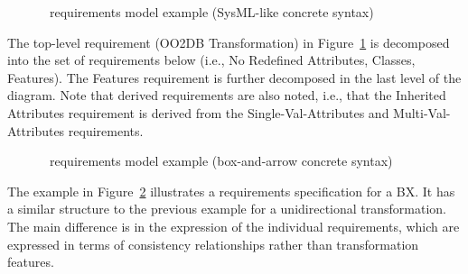 \begin{figure}[htbp]
\caption{\transml\ requirements model example (SysML-like concrete syntax) \cite{GuerraLKPS13}}
\label{fig:transml-requirements-example1}
\end{figure}

The top-level requirement (OO2DB Transformation) in Figure~\ref{fig:transml-requirements-example1} is decomposed into the set of requirements below (i.e., No Redefined Attributes, Classes, Features). The Features requirement is further decomposed in the last level of the diagram. Note that derived requirements are also noted, i.e., that the Inherited Attributes requirement is derived from the Single-Val-Attributes and Multi-Val-Attributes requirements.

\begin{figure}[htbp]
\caption{\transml\ requirements model example (box-and-arrow concrete syntax)}
\label{fig:transml-requirements-example2}
\end{figure}

The example in Figure~\ref{fig:transml-requirements-example2} illustrates a requirements specification for a BX. It has a similar structure to the previous example for a unidirectional transformation. The main difference is in the expression of the individual requirements, which are expressed in terms of consistency relationships rather than transformation features. 

